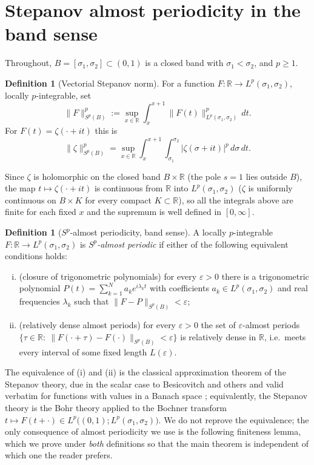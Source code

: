 \documentclass[11pt]{amsart}
\theoremstyle{definition}
\newtheorem{definition}[theorem]{Definition}
\theoremstyle{remark}
\newcommand{\bbR}{\mathbb{R}}
\begin{document}
\section{Stepanov almost periodicity in the band sense}\label{sec:defs}

Throughout, $B=[\sigma_1,\sigma_2]\subset(0,1)$ is a closed
band with $\sigma_1<\sigma_2$, and $p\geq1$.

\begin{definition}[Vectorial Stepanov norm]\label{def:norm}
For a function $F\colon\bbR\to L^p(\sigma_1,\sigma_2)$, locally
$p$-integrable, set
\[
\|F\|_{S^p(B)}^p:=\sup_{x\in\bbR}\int_x^{x+1}
\|F(t)\|_{L^p(\sigma_1,\sigma_2)}^p\,dt .
\]
For $F(t)=\zeta(\cdot+it)$ this is
\[
\|\zeta\|_{S^p(B)}^p
=\sup_{x\in\bbR}\int_x^{x+1}\!\!\int_{\sigma_1}^{\sigma_2}
|\zeta(\sigma+it)|^p\,d\sigma\,dt .
\]
\end{definition}

Since $\zeta$ is holomorphic on the closed band $B\times\bbR$ (the
pole $s=1$ lies outside $B$), the map $t\mapsto\zeta(\cdot+it)$ is
continuous from $\bbR$ into $L^p(\sigma_1,\sigma_2)$ ($\zeta$ is
uniformly continuous on $B\times K$ for every compact
$K\subset\bbR$), so all the integrals above are finite for each fixed
$x$ and the supremum is well defined in $[0,\infty]$.

\begin{definition}[$S^p$-almost periodicity, band sense]\label{def:sp-ap}
A locally $p$-integrable $F\colon\bbR\to L^p(\sigma_1,\sigma_2)$ is
\emph{$S^p$-almost periodic} if either of the following equivalent
conditions holds:
\begin{enumerate}[(i)]
\item (closure of trigonometric polynomials) for every
$\varepsilon>0$ there is a trigonometric polynomial
$P(t)=\sum_{k=1}^{N}a_k e^{i\lambda_k t}$ with coefficients
$a_k\in L^p(\sigma_1,\sigma_2)$ and real frequencies $\lambda_k$ such
that $\|F-P\|_{S^p(B)}<\varepsilon$;
\item (relatively dense almost periods) for every $\varepsilon>0$ the
set of $\varepsilon$-almost periods
$\{\tau\in\bbR:\ \|F(\cdot+\tau)-F(\cdot)\|_{S^p(B)}<\varepsilon\}$
is relatively dense in $\bbR$, i.e.\ meets every interval of some
fixed length $L(\varepsilon)$.
\end{enumerate}
\end{definition}

The equivalence of (i) and (ii) is the classical approximation theorem
of the Stepanov theory, due in the scalar case to Besicovitch and
others \cite[Ch.~II]{Besicovitch} and valid verbatim for functions
with values in a Banach space \cite{LevitanZhikov}; equivalently, the
Stepanov theory is the Bohr theory applied to the Bochner transform
$t\mapsto F(t+\cdot)\in L^p\bigl((0,1);L^p(\sigma_1,\sigma_2)\bigr)$.
We do not reprove the equivalence; the only consequence of
almost periodicity we use is the following finiteness lemma, which we
prove under \emph{both} definitions so that the main theorem is
independent of which one the reader prefers.
\end{document}
